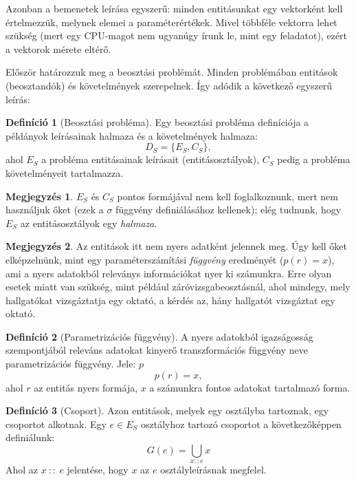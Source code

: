 \documentclass[twocolumn]{article}
\theoremstyle{definition}
\newtheorem{definition}{Definíció}[section]
\newtheorem*{megj}{Megjegyzés}
\newcommand{\set}[1]{ \{ {#1} \} }
\begin{document}
    Azonban a bemenetek leírása egyszerű: minden entitásunkat egy vektorként kell értelmezzük, melynek elemei a paraméterértékek. Mivel többféle vektorra lehet szükség (mert egy CPU-magot nem ugyanúgy írunk le, mint egy feladatot), ezért a vektorok mérete eltérő.
    
    Először határozzuk meg a beosztási problémát. Minden problémában entitások (beosztandók) és követelmények szerepelnek. Így adódik a következő egyszerű leírás:
    
    \begin{definition}[Beosztási probléma] \label{def:problema}
        Egy beosztási probléma definíciója a példányok leírásainak halmaza és a követelmények halmaza:
        \begin{equation}
            D_S = \set{E_S, C_S},
        \end{equation}
        ahol $E_S$ a probléma entitásainak leírásait (entitásosztályok), $C_S$ pedig a probléma követelményeit tartalmazza.
        \begin{megj}
            $E_S$ és $C_S$ pontos formájával nem kell foglalkoznunk, mert nem használjuk őket (ezek a $\sigma$ függvény definiálásához kellenek); elég tudnunk, hogy $E_S$ az entitásosztályok egy {\it halmaza}.
        \end{megj}
        \begin{megj} \label{megj:param_func}
            Az entitások itt nem nyers adatként jelennek meg. Úgy kell őket elképzelnünk, mint egy paraméterszámítási {\it függvény} eredményét ($p(r) = x$), ami a nyers adatokból releványs információkat nyer ki számunkra. Erre olyan esetek miatt van szükség, mint például záróvizsgabeosztásnál, ahol mindegy, mely hallgatókat vizsgáztatja egy oktató, a kérdés az, hány hallgatót vizsgáztat egy oktató.
        \end{megj}
    \end{definition}
    
    \begin{definition}[Parametrizációs függvény]
        A nyers adatokból igazságosság szempontjából releváns adatokat kinyerő transzformációs függvény neve parametrizációs függvény. Jele: $p$
        \begin{equation}
            p(r) = x,
        \end{equation}
        ahol $r$ az entitás nyers formája, $x$ a számunkra fontos adatokat tartalmazó forma.
    \end{definition}
    
    \begin{definition}[Csoport]
        Azon entitások, melyek egy osztályba tartoznak, egy csoportot alkotnak. Egy $e \in E_S$ osztályhoz tartozó csoportot a következőképpen definiálunk:
        \begin{equation}
            G(e) = \bigcup_{x :: e} x
        \end{equation}
        Ahol az $x \ :: \ e$ jelentése, hogy $x$ az $e$ osztályleírásnak megfelel. 
    \end{definition}
    
\end{document}
